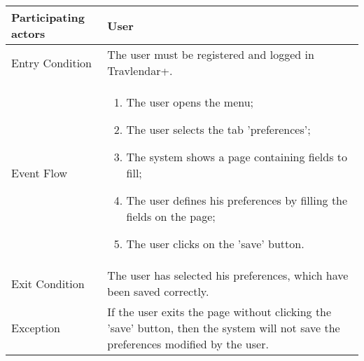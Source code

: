 \begin{table}[H]
	\begin{center}
		\begin{tabular}{ | p{} | p{} | }
		\hline
		Participating actors & User\\
		\hline
		Entry Condition & The user must be registered and logged in Travlendar+.\\
		\hline
		Event Flow & 
			\begin{enumerate}
				\item The user opens the menu;
				\item The user selects the tab 'preferences';
				\item The system shows a page containing fields to fill;
				\item The user defines his preferences by filling the fields on the page;
				\item The user clicks on the 'save' button.
			\end{enumerate} \\
		\hline
		Exit Condition & The user has selected his preferences, which have been saved correctly.\\
		\hline
		Exception & If the user exits the page without clicking the 'save' button, then the system will not save the preferences modified by the user.\\ 
		\hline
		\end{tabular}
	\end{center}
\end{table}